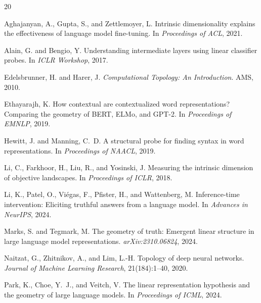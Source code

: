 \documentclass[11pt,a4paper]{article}
\begin{document}
\begin{thebibliography}{20}

Aghajanyan, A., Gupta, S., and Zettlemoyer, L.
\newblock Intrinsic dimensionality explains the effectiveness of language model fine-tuning.
\newblock In \emph{Proceedings of ACL}, 2021.

Alain, G. and Bengio, Y.
\newblock Understanding intermediate layers using linear classifier probes.
\newblock In \emph{ICLR Workshop}, 2017.

Edelsbrunner, H. and Harer, J.
\newblock \emph{Computational Topology: An Introduction}.
\newblock AMS, 2010.

Ethayarajh, K.
\newblock How contextual are contextualized word representations? {C}omparing the geometry of {BERT}, {ELMo}, and {GPT-2}.
\newblock In \emph{Proceedings of EMNLP}, 2019.

Hewitt, J. and Manning, C.~D.
\newblock A structural probe for finding syntax in word representations.
\newblock In \emph{Proceedings of NAACL}, 2019.

Li, C., Farkhoor, H., Liu, R., and Yosinski, J.
\newblock Measuring the intrinsic dimension of objective landscapes.
\newblock In \emph{Proceedings of ICLR}, 2018.

Li, K., Patel, O., Vi\'{e}gas, F., Pfister, H., and Wattenberg, M.
\newblock Inference-time intervention: Eliciting truthful answers from a language model.
\newblock In \emph{Advances in NeurIPS}, 2024.

Marks, S. and Tegmark, M.
\newblock The geometry of truth: Emergent linear structure in large language model representations.
\newblock \emph{arXiv:2310.06824}, 2024.

Naitzat, G., Zhitnikov, A., and Lim, L.-H.
\newblock Topology of deep neural networks.
\newblock \emph{Journal of Machine Learning Research}, 21(184):1--40, 2020.

Park, K., Choe, Y.~J., and Veitch, V.
\newblock The linear representation hypothesis and the geometry of large language models.
\newblock In \emph{Proceedings of ICML}, 2024.


\end{thebibliography}
\end{document}
